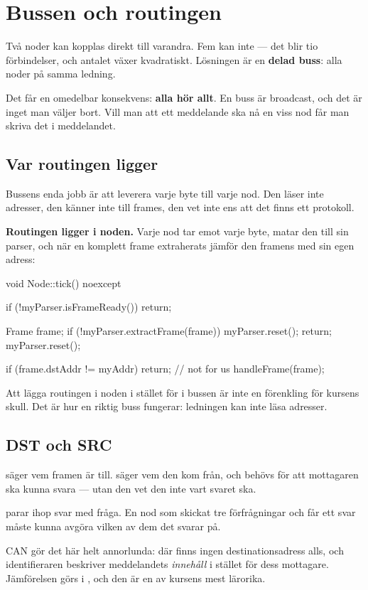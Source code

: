 \section{Bussen och routingen}
\label{sec:bus}

Två noder kan kopplas direkt till varandra. Fem kan inte --- det blir tio förbindelser, och antalet
växer kvadratiskt. Lösningen är en \textbf{delad buss}: alla noder på samma ledning.

Det får en omedelbar konsekvens: \textbf{alla hör allt}. En buss är broadcast, och det är inget man
väljer bort. Vill man att ett meddelande ska nå en viss nod får man skriva det i meddelandet.

\subsection{Var routingen ligger}

Bussens enda jobb är att leverera varje byte till varje nod. Den läser inte adresser, den känner
inte till frames, den vet inte ens att det finns ett protokoll.

\textbf{Routingen ligger i noden.} Varje nod tar emot varje byte, matar den till sin parser, och
när en komplett frame extraherats jämför den framens  med sin egen adress:

\begin{cppcode}
void Node::tick() noexcept
{
    if (!myParser.isFrameReady()) { return; }

    Frame frame{};
    if (!myParser.extractFrame(frame)) { myParser.reset(); return; }
    myParser.reset();

    if (frame.dstAddr != myAddr) { return; }   // not for us
    handleFrame(frame);
}
\end{cppcode}

Att lägga routingen i noden i stället för i bussen är inte en förenkling för kursens skull. Det är
hur en riktig buss fungerar: ledningen kan inte läsa adresser.

\subsection{DST och SRC}

 säger vem framen är till.  säger vem den kom från, och behövs för att
mottagaren ska kunna svara --- utan den vet den inte vart svaret ska.

 parar ihop svar med fråga. En nod som skickat tre förfrågningar och får ett svar måste
kunna avgöra vilken av dem det svarar på.

\begin{aside}
\note CAN gör det här helt annorlunda: där finns ingen destinationsadress alls, och
identifieraren beskriver meddelandets \emph{innehåll} i stället för dess mottagare. Jämförelsen
görs i , och den är en av kursens mest lärorika.
\end{aside}
